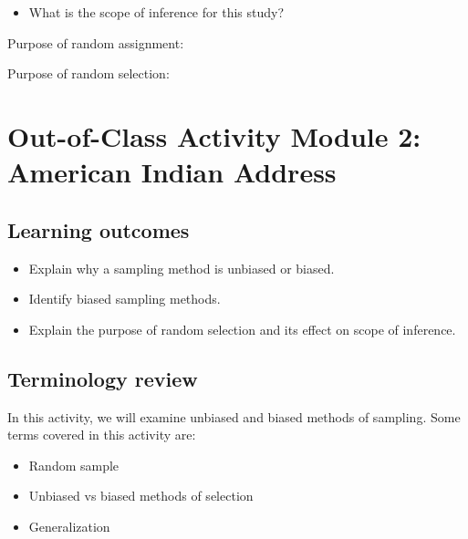 \documentclass[
]{report}
\providecommand{\tightlist}{%
  \setlength{\itemsep}{0pt}\setlength{\parskip}{0pt}}
\begin{document}
\begin{itemize}
\tightlist
\item
  What is the scope of inference for this study?
\end{itemize}

\vspace{0.8in}

Purpose of random assignment:

\vspace{0.8in}

Purpose of random selection:

\newpage
\vspace{0.8in}

\hypertarget{out-of-class-activity-module-2-american-indian-address}{%
\section{Out-of-Class Activity Module 2: American Indian Address}\label{out-of-class-activity-module-2-american-indian-address}}


\hypertarget{learning-outcomes-1}{%
\subsection{Learning outcomes}\label{learning-outcomes-1}}

\begin{itemize}
\item
  Explain why a sampling method is unbiased or biased.
\item
  Identify biased sampling methods.
\item
  Explain the purpose of random selection and its effect on scope of inference.
\end{itemize}

\hypertarget{terminology-review-1}{%
\subsection{Terminology review}\label{terminology-review-1}}

In this activity, we will examine unbiased and biased methods of sampling. Some terms covered in this activity are:

\begin{itemize}
\item
  Random sample
\item
  Unbiased vs biased methods of selection
\item
  Generalization
\end{itemize}
\end{document}
